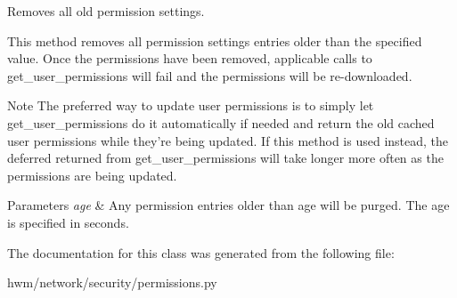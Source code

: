 Removes all old permission settings. 

\begin{DoxyVerb} This method removes all permission settings entries older than the specified value. Once the permissions have been 
 removed, applicable calls to get_user_permissions will fail and the permissions will be re-downloaded.
\end{DoxyVerb}


\begin{DoxyNote}{Note}
The preferred way to update user permissions is to simply let get\-\_\-user\-\_\-permissions do it automatically if needed and return the old cached user permissions while they're being updated. If this method is used instead, the deferred returned from get\-\_\-user\-\_\-permissions will take longer more often as the permissions are being updated.
\end{DoxyNote}

\begin{DoxyParams}{Parameters}
{\em age} & Any permission entries older than age will be purged. The age is specified in seconds. \\
\hline
\end{DoxyParams}


The documentation for this class was generated from the following file\-:\begin{DoxyCompactItemize}
\item 
hwm/network/security/permissions.\-py\end{DoxyCompactItemize}
